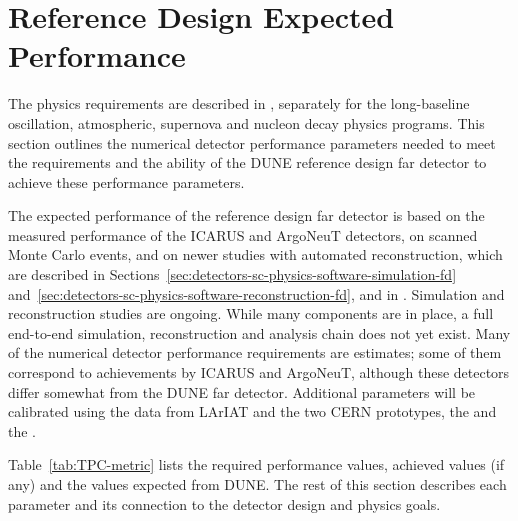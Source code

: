 
\section{Reference Design Expected Performance}
\label{sec:detectors-fd-ref-perf}

The physics requirements are described in \volphys,
separately for the long-baseline oscillation, atmospheric, supernova
and nucleon decay physics programs.  This section outlines the
numerical detector performance parameters needed to meet the
requirements and the ability of the DUNE reference
design far detector to achieve these performance parameters.  

The
expected performance of the reference design far detector is based on the measured
performance of the ICARUS\cite{Amerio:2004ze} and
ArgoNeuT\cite{Anderson:2012vc} detectors, on scanned Monte Carlo
events\cite{docdb-6954}, and on newer studies with automated
reconstruction, which are described in
Sections~\ref{sec:detectors-sc-physics-software-simulation-fd}
and~\ref{sec:detectors-sc-physics-software-reconstruction-fd}, and in
\anxreco.  Simulation and reconstruction studies are ongoing.  While
many components are in place, a full end-to-end simulation,
reconstruction and analysis chain does not yet exist. Many
of the numerical detector performance requirements are estimates; some of them
correspond to achievements by ICARUS and
ArgoNeuT, although these detectors %
differ somewhat from the DUNE far
detector.  Additional parameters will be calibrated using the data
from LArIAT and the two CERN prototypes, the \cernsingleproto{} and
the \cerndualproto.

Table~\ref{tab:TPC-metric} lists the required performance values, achieved values (if any) and 
the values expected from DUNE. The rest of this section describes each parameter and
its connection to the detector design and physics goals.


